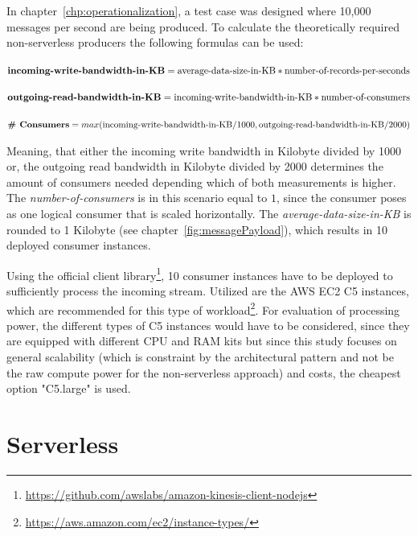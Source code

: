 In chapter~\vref{chp:operationalization}, a test case was designed where 10,000 messages per second are being produced. To calculate the theoretically required non-serverless producers the following formulas\autocite{AmazonFAQs} can be used:

$\textbf{incoming-write-bandwidth-in-KB} = \\
\text{average-data-size-in-KB} * \text{number-of-records-per-seconds}$

$\textbf{outgoing-read-bandwidth-in-KB} = \\
\text{incoming-write-bandwidth-in-KB} * \text{number-of-consumers}$

$\textbf{\# Consumers} = \\
max(\text{incoming-write-bandwidth-in-KB}/1000, \text{outgoing-read-bandwidth-in-KB}/2000)$

Meaning, that either the incoming write bandwidth in Kilobyte divided by 1000 or, the outgoing read bandwidth in Kilobyte divided by 2000 determines the amount of consumers needed depending which of both measurements is higher. The \textit{number-of-consumers} is in this scenario equal to $1$, since the consumer poses as one logical consumer that is scaled horizontally. The \textit{average-data-size-in-KB} is rounded to 1 Kilobyte (see chapter~\vref{fig:messagePayload}), which results in 10 deployed consumer instances.  

Using the official client library\footnote{\url{https://github.com/awslabs/amazon-kinesis-client-nodejs}}, 10 consumer instances have to be deployed to sufficiently process the incoming stream. Utilized are the AWS EC2 C5 instances, which are recommended for this type of workload\footnote{\url{https://aws.amazon.com/ec2/instance-types/}}. For evaluation of processing power, the different types of C5 instances would have to be considered, since they are equipped with different CPU and RAM kits but since this study focuses on general scalability (which is constraint by the architectural pattern and not be the raw compute power for the non-serverless approach) and costs, the cheapest option "C5.large" is used. 


\section{Serverless}\label{chp:protoSL}

